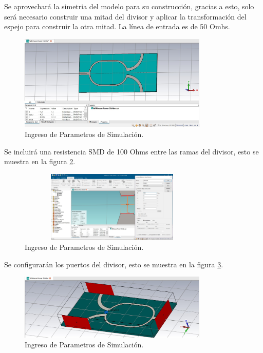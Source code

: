 \documentclass[a4paper]{IEEEtran} %
\begin{document}
Se aprovechará la simetria del modelo para su construcción, gracias a esto, solo será necesario construir una mitad del divisor y aplicar la transformación del espejo para construir la otra mitad. La línea de entrada es de 50 Omhs. 
\begin{figure}[h]    
    \centering
    \includegraphics[width=9cm]{imagenes/img9}
    \caption{Ingreso de Parametros de Simulación.}
    \label{fig:modelamiento4}
\end{figure} 

Se incluirá una resistencia SMD de 100 Ohms entre las ramas del divisor, esto se muestra en la figura \ref{fig:modelamiento5}.
\begin{figure}[h]    
    \centering
    \includegraphics[width=9cm,height=3.403cm]{imagenes/img10}
    \caption{Ingreso de Parametros de Simulación.}
    \label{fig:modelamiento5}
\end{figure} 

Se configurarán los puertos del divisor, esto se muestra en la figura \ref{fig:modelamiento6}.
\begin{figure}[h]    
    \centering
    \includegraphics[width=9cm]{imagenes/img11}
    \caption{Ingreso de Parametros de Simulación.}
    \label{fig:modelamiento6}
\end{figure}
\end{document}
